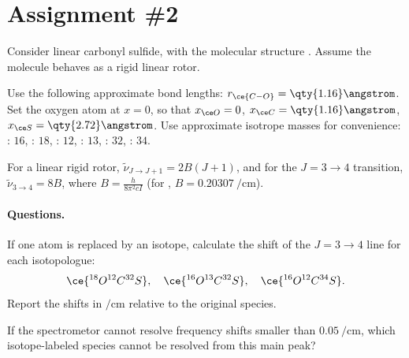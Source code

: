 
\section{Assignment \#2}

\begin{problem}[note = Isotope shifts in the rotational spectrum of OCS (2pts),
                label = hw2:problem1]
  \leavevmode \vspace*{-.5\baselineskip}
  \begin{snugshade}
    \begin{enumext}[label = \ensuremath \ast]
      \item
      Consider linear carbonyl sulfide,  with the
      molecular structure .
      Assume the molecule behaves as a rigid linear rotor.
      \item
      Use the following approximate bond lengths:
      $r_{\ce{C-O}} = \qty{1.16}\angstrom$.
      Set the oxygen atom at $x = 0$, so that $x_{\ce O} = 0$,
      $x_{\ce C} = \qty{1.16}\angstrom$, $x_{\ce S} = \qty{2.72}\angstrom$.
      Use approximate isotrope masses for convenience:
      : $16$, : $18$, : $12$,
      : $13$, : $32$, : $34$.
      \item
      For a linear rigid rotor, $\tilde\nu_{J \to J+1} = 2B(J + 1)$, and for the
      $J = 3 \to 4$ transition, $\tilde \nu_{3 \to 4} = 8B$,
      where $B = \frac{h}{8\pi^2cI}$
      (for , $B = \qty{0.20307}{\per\cm}$).
    \end{enumext}
  \end{snugshade}
  \paragraph{Questions.}
  \begin{enumext}
    \item If one atom is replaced by an isotope, calculate the shift of the
    $J = 3 \to 4$ line for each isotopologue:
    \[
      \ce{^{18}O ^{12}C ^{32}S}, \quad
      \ce{^{16}O ^{13}C ^{32}S}, \quad
      \ce{^{16}O ^{12}C ^{34}S}.
    \]
    Report the shifts in $\unit{\per\cm}$ relative to the original species.
    \item If the spectrometor cannot resolve frequency shifts smaller than
    $\qty{0.05}{\per\cm}$, which isotope-labeled species cannot be resolved
    from this main peak?
  \end{enumext}
\end{problem}
